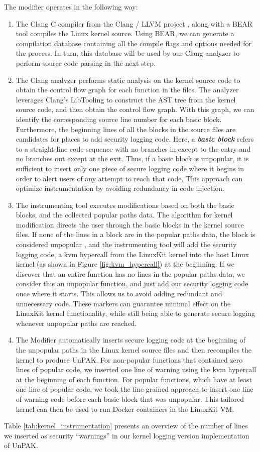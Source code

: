 The modifier operates in the following way: 
\begin{enumerate}
	\item The Clang C compiler from the Clang / LLVM project \cite{llvm}, along with a BEAR \cite{bear} tool compiles the Linux kernel source. Using BEAR, we can generate a compilation database containing all the compile flags and options needed for the process. In turn, this database will be used by our Clang analyzer to perform source code parsing in the next step.
	\item The Clang analyzer performs static analysis on the kernel source code to obtain the control flow graph for each function in the files. The analyzer leverages Clang's LibTooling \cite{clang-libtooling} to construct the AST tree from the kernel source code, and then obtain the control flow graph. With this graph, we can identify the corresponding source line number for each basic block. Furthermore, the beginning lines of all the blocks in the source files are candidates for places to add security logging code. Here, a \textbf{\textit{basic block}} refers to a straight-line code sequence with no branches in except to the entry and no branches out except at the exit. Thus, if a basic block is unpopular, it is sufficient to insert only one piece of secure logging code where it begins in order to alert users of any attempt to reach that code. This approach can optimize instrumentation by  avoiding redundancy in code injection. 
	\item The instrumenting tool executes modifications based on both the basic blocks, and the collected popular paths data. The algorithm for kernel modification directs the user through the basic blocks in the kernel source files. If none of the lines in a block are in the popular paths data, the block is considered unpopular , and the  instrumenting tool will add the security logging code,  a kvm hypercall from the LinuxKit kernel into the host Linux kernel (as shown in Figure \ref{fig:kvm_hypercall}) at the beginning. If we discover that an entire function has no lines in the popular paths data, we consider this an unpopular function, and just add our security logging code once where it starts. This allows us to avoid adding redundant and unnecessary code. These markers can guarantee minimal effect on the LinuxKit kernel functionality, while still being able to generate secure logging whenever unpopular paths are reached.  
	\item The Modifier automatically inserts secure logging code at the beginning of the unpopular paths in the Linux kernel source files and then recompiles the kernel to produce UnPAK. For non-popular functions that contained zero lines of popular code, we inserted one line of warning using the kvm hypercall at the beginning of each function. For popular functions, which have at least one line of popular code, we took the fine-grained approach to insert one line of warning code before each basic block that was unpopular. This tailored kernel can then be used to run Docker containers in the LinuxKit VM. 
\end{enumerate}

Table \ref{tab:kernel_instrumentation} presents an overview of the number of lines we inserted as security ``warnings'' in our kernel logging version implementation of UnPAK.  